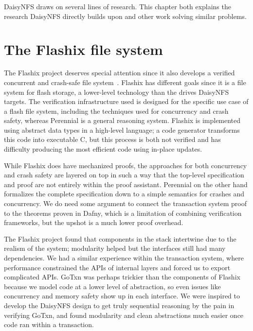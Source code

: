 DaisyNFS draws on several lines of research. This chapter both explains the
research DaisyNFS directly builds upon and other work solving similar problems.

\resume

\section{The Flashix file system}

The Flashix project deserves special attention since it also develops a verified
concurrent and crash-safe file system~\cite{bodenmuller:concurrent-flashix}.
Flashix has different goals since it is a file system for flash storage, a
lower-level technology than the drives DaisyNFS targets. The verification
infrastructure used is designed for the specific use case of a flash file
system, including the techniques used for concurrency and crash safety, whereas
Perennial is a general reasoning system. Flashix is implemented using abstract
data types in a high-level language; a code generator transforms this code into
executable C, but this process is both not verified and has difficulty producing
the most efficient code using in-place updates.

While Flashix does have mechanized proofs, the approaches for both concurrency
and crash safety are layered on top in such a way that the top-level
specification and proof are not entirely within the proof assistant. Perennial
on the other hand formalizes the complete specification down to a simple
semantics for crashes and concurrency. We do need some argument to connect the
transaction system proof to the theorems proven in Dafny, which is a limitation
of combining verification frameworks, but the upshot is a much lower proof
overhead.

The Flashix project found that components in the stack intertwine due to the
realism of the system; modularity helped but the interfaces still had many
dependencies. We had a similar experience within the transaction system, where
performance constrained the APIs of internal layers and forced us to export
complicated APIs. GoTxn was perhaps trickier than the components of Flashix
because we model code at a lower level of abstraction, so even issues like
concurrency and memory safety show up in each interface. We were inspired to
develop the DaisyNFS design to get truly sequential reasoning by the pain in
verifying GoTxn, and found modularity and clean abstractions much easier once
code ran within a transaction.

